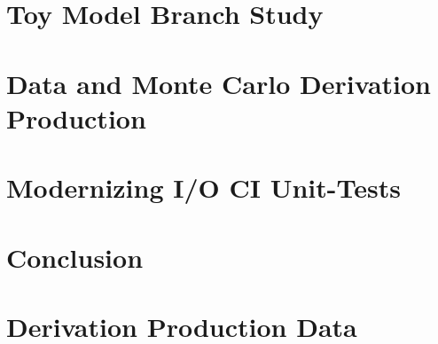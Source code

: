 \documentclass[12pt]{niuthesis}
\begin{document}
\chapter{Toy Model Branch Study}
\label{chap:Toy_Model}


\chapter{Data and Monte Carlo Derivation Production}
\label{chap:DAODProd}


\chapter{Modernizing I/O CI Unit-Tests}
\label{chap:Modernize}


\chapter{Conclusion}




\printbibliography

\clearpage
\appendix

% 

\chapter{Derivation Production Data}

\end{document}
